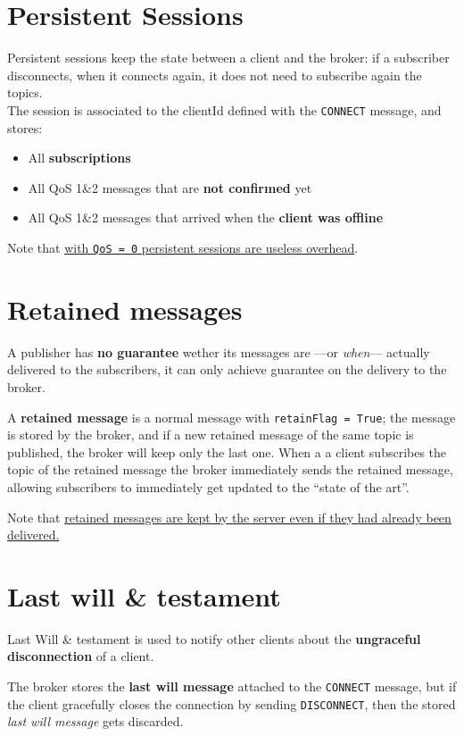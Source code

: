 \section{Persistent Sessions}
Persistent sessions keep the state between a client and the broker:
if a subscriber disconnects, when it connects again, it does not need to subscribe again the topics.\\
The session is associated to the clientId defined with the \texttt{CONNECT} message, and stores:
\begin{itemize}
   \item All \textbf{subscriptions}
   \item All QoS 1\&2 messages that are \textbf{not confirmed} yet
   \item All QoS 1\&2 messages that arrived when the \textbf{client was
   offline}
\end{itemize}

Note that \ul{with \texttt{QoS = 0} persistent sessions are useless overhead}.

\section{Retained messages}
A publisher has \textbf{no guarantee} wether its messages are ---or \textit{when}---
actually delivered to the subscribers,
it can only achieve guarantee on the delivery to the broker.

A \textbf{retained message} is a normal message with
\texttt{retainFlag = True}; the message is stored by the broker, and if a new retained message of the same topic is published, the broker will keep only the last one.
When a a client subscribes the topic of the retained
message  the broker immediately sends the retained message,
allowing subscribers to immediately get updated to the ``state of the art''.

Note that \ul{retained messages are kept by the server even if they had already been delivered.}

\section{Last will \& testament}
Last Will \& testament is used to notify other clients about the \textbf{ungraceful disconnection} of a client.

The broker stores the \textbf{last will message} attached to the \texttt{CONNECT} message, but if the client gracefully closes the connection by sending \texttt{DISCONNECT}, then the stored \textit{last will message} gets discarded.

